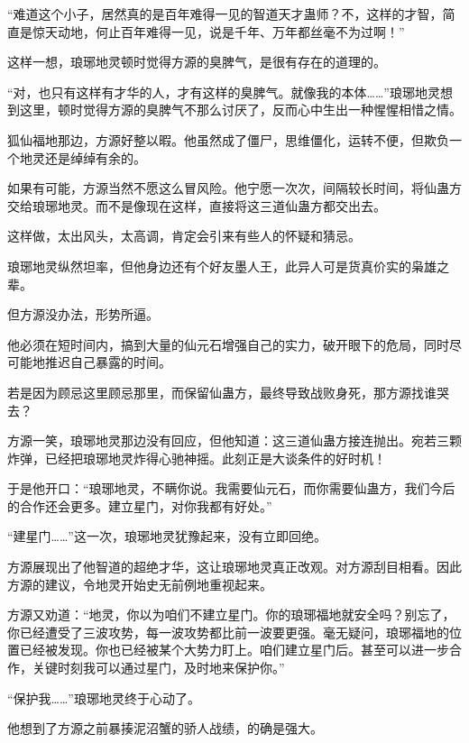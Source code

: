 
\begin{this_body}

“难道这个小子，居然真的是百年难得一见的智道天才蛊师？不，这样的才智，简直是惊天动地，何止百年难得一见，说是千年、万年都丝毫不为过啊！”

这样一想，琅琊地灵顿时觉得方源的臭脾气，是很有存在的道理的。

“对，也只有这样有才华的人，才有这样的臭脾气。就像我的本体……”琅琊地灵想到这里，顿时觉得方源的臭脾气不那么讨厌了，反而心中生出一种惺惺相惜之情。

狐仙福地那边，方源好整以暇。他虽然成了僵尸，思维僵化，运转不便，但欺负一个地灵还是绰绰有余的。

如果有可能，方源当然不愿这么冒风险。他宁愿一次次，间隔较长时间，将仙蛊方交给琅琊地灵。而不是像现在这样，直接将这三道仙蛊方都交出去。

这样做，太出风头，太高调，肯定会引来有些人的怀疑和猜忌。

琅琊地灵纵然坦率，但他身边还有个好友墨人王，此异人可是货真价实的枭雄之辈。

但方源没办法，形势所逼。

他必须在短时间内，搞到大量的仙元石增强自己的实力，破开眼下的危局，同时尽可能地推迟自己暴露的时间。

若是因为顾忌这里顾忌那里，而保留仙蛊方，最终导致战败身死，那方源找谁哭去？

方源一笑，琅琊地灵那边没有回应，但他知道：这三道仙蛊方接连抛出。宛若三颗炸弹，已经把琅琊地灵炸得心驰神摇。此刻正是大谈条件的好时机！

于是他开口：“琅琊地灵，不瞒你说。我需要仙元石，而你需要仙蛊方，我们今后的合作还会更多。建立星门，对你我都有好处。”

“建星门……”这一次，琅琊地灵犹豫起来，没有立即回绝。

方源展现出了他智道的超绝才华，这让琅琊地灵真正改观。对方源刮目相看。因此方源的建议，令地灵开始史无前例地重视起来。

方源又劝道：“地灵，你以为咱们不建立星门。你的琅琊福地就安全吗？别忘了，你已经遭受了三波攻势，每一波攻势都比前一波要更强。毫无疑问，琅琊福地的位置已经被发现。你也已经被某个大势力盯上。咱们建立星门后。甚至可以进一步合作，关键时刻我可以通过星门，及时地来保护你。”

“保护我……”琅琊地灵终于心动了。

他想到了方源之前暴揍泥沼蟹的骄人战绩，的确是强大。


\end{this_body}
